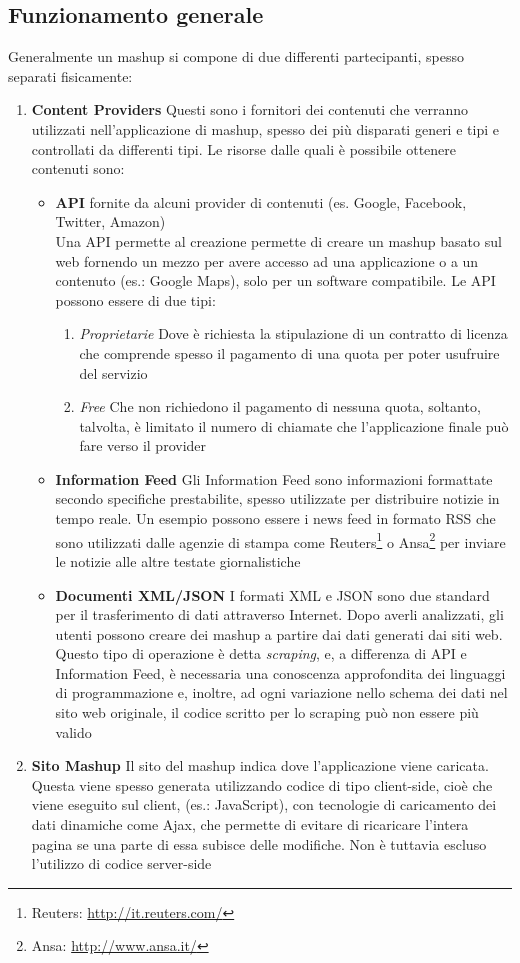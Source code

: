 \subsection{Funzionamento generale\label{sec:mashup-operations}}
Generalmente un mashup si compone di due differenti partecipanti, spesso separati fisicamente:
\begin{enumerate}
	\item \textbf{Content Providers} Questi sono i fornitori dei contenuti che verranno utilizzati nell'applicazione di mashup, spesso dei più disparati generi e tipi e controllati da differenti tipi.
	Le risorse dalle quali è possibile ottenere contenuti sono:
	\begin{itemize}
		\item \textbf{API} fornite da alcuni provider di contenuti (es. Google, Facebook, Twitter, Amazon)\\
		Una API permette al creazione permette di creare un mashup basato sul web fornendo un mezzo per avere accesso ad una applicazione o a un contenuto (es.: Google Maps), solo per un software compatibile.
		Le API possono essere di due tipi:
		\begin{enumerate}
			\item \emph{Proprietarie} Dove è richiesta la stipulazione di un contratto di licenza che comprende spesso il pagamento di una quota per poter usufruire del servizio
			\item \emph{Free} Che non richiedono il pagamento di nessuna quota, soltanto, talvolta, è limitato il numero di chiamate che l'applicazione finale può fare verso il provider
		\end{enumerate} 
		\item \textbf{Information Feed} Gli Information Feed sono informazioni formattate secondo specifiche prestabilite, spesso utilizzate per distribuire notizie in tempo reale. Un esempio possono essere i news feed in formato RSS che sono utilizzati dalle agenzie di stampa come Reuters\footnote{Reuters: \url{http://it.reuters.com/}} o Ansa\footnote{Ansa: \url{http://www.ansa.it/}} per inviare le notizie alle altre testate giornalistiche
		\item \textbf{Documenti XML/JSON} I formati XML e JSON sono due standard per il trasferimento di dati attraverso Internet. Dopo averli analizzati, gli utenti possono creare dei mashup a partire dai dati generati dai siti web. Questo tipo di operazione è detta \emph{scraping}, e, a differenza di API e Information Feed, è necessaria una conoscenza approfondita dei linguaggi di programmazione e, inoltre, ad ogni variazione nello schema dei dati nel sito web originale, il codice scritto per lo scraping può non essere più valido
	\end{itemize} 
	\item \textbf{Sito Mashup}
	Il sito del mashup indica dove l'applicazione viene caricata. Questa viene spesso generata utilizzando codice di tipo client-side, cioè che viene eseguito sul client, (es.: JavaScript), con tecnologie di caricamento dei dati dinamiche come Ajax, che permette di evitare di ricaricare l'intera pagina se una parte di essa subisce delle modifiche. Non è tuttavia escluso l'utilizzo di codice server-side
\end{enumerate}

